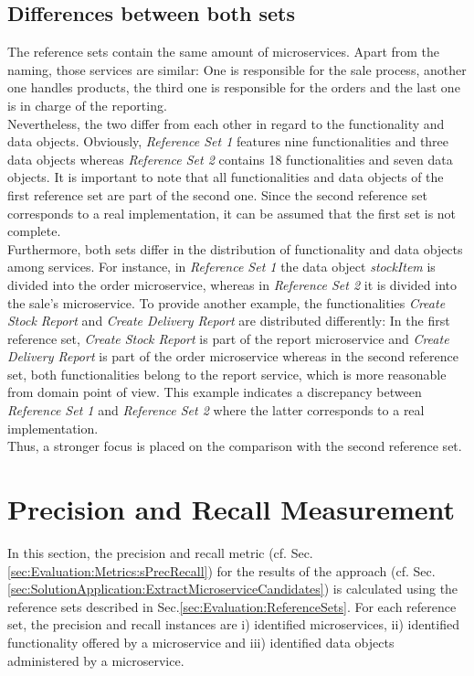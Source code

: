\subsection{Differences between both sets}
The reference sets contain the same amount of microservices. Apart from the naming, those services are similar: One is responsible for the sale process, another one handles products, the third one is responsible for the orders and the last one is in charge of the reporting. \\
Nevertheless, the two differ from each other in regard to the functionality and data objects. Obviously, \textit{Reference Set 1} features nine functionalities and three data objects whereas \textit{Reference Set 2} contains 18 functionalities and seven data objects. It is important to note that all functionalities and data objects of the first reference set are part of the second one. Since the second reference set corresponds to a real implementation, it can be assumed that the first set is not complete. \\
Furthermore, both sets differ in the distribution of functionality and data objects among services. For instance, in \textit{Reference Set 1} the data object \textit{stockItem} is divided into the order microservice, whereas in \textit{Reference Set 2} it is divided into the sale's microservice. To provide another example, the functionalities \textit{Create Stock Report} and \textit{Create Delivery Report} are distributed differently: In the first reference set, \textit{Create Stock Report} is part of the report microservice and \textit{Create Delivery Report} is part of the order microservice whereas in the second reference set, both functionalities belong to the report service, which is more reasonable from domain point of view. This example indicates a discrepancy between \textit{Reference Set 1} and \textit{Reference Set 2} where the latter corresponds to a real implementation. \\
Thus, a stronger focus is placed on the comparison with the second reference set.




\section{Precision and Recall Measurement}
\label{sec:Evalutation:PrecisionAndRecallMeasurement}
In this section, the precision and recall metric (cf. Sec.\ref{sec:Evaluation:Metrics:sPrecRecall}) for the results of the approach (cf. Sec.\ref{sec:SolutionApplication:ExtractMicroserviceCandidates}) is calculated using the reference sets described in Sec.\ref{sec:Evaluation:ReferenceSets}. 
For each reference set, the precision and recall instances are i) identified microservices, ii) identified functionality offered by a microservice and iii) identified data objects administered by a microservice. 

